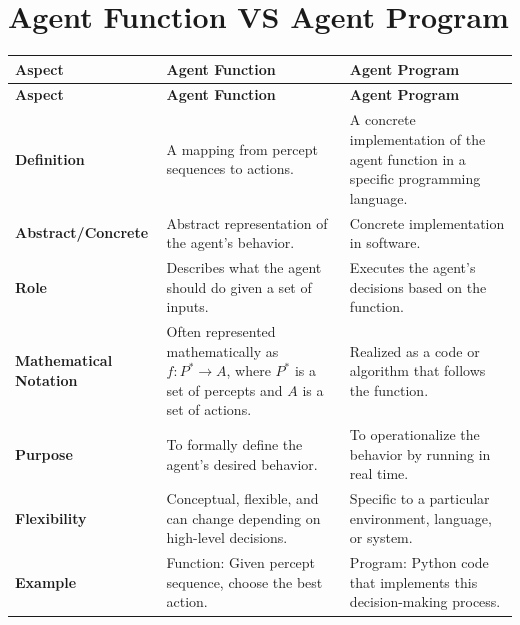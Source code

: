 

\section{Agent Function VS Agent Program \cite{chatgpt}} \label{Agent Function VS Agent Program}

\begin{customTableWrapper}{1.5}
\begin{longtable}{|p{4cm}|p{5.5cm}|p{5.5cm}|}
    \hline
    \textbf{Aspect} & \textbf{Agent Function} & \textbf{Agent Program} \\
    \hline
    \endfirsthead

    \hline
    \textbf{Aspect} & \textbf{Agent Function} & \textbf{Agent Program} \\
    \hline
    \endhead
    
    \hline
    \endfoot
    
    \hline
    \endlastfoot
    
    \textbf{Definition} & A mapping from percept sequences to actions. & A concrete implementation of the agent function in a specific programming language. \\
    \hline
    
    \textbf{Abstract/Concrete} & Abstract representation of the agent's behavior. & Concrete implementation in software. \\
    \hline
    
    \textbf{Role} & Describes what the agent should do given a set of inputs. & Executes the agent's decisions based on the function. \\
    \hline
    
    \textbf{Mathematical Notation} & Often represented mathematically as \( f: P^* \rightarrow A \), where \( P^* \) is a set of percepts and \( A \) is a set of actions. & Realized as a code or algorithm that follows the function. \\
    \hline
    
    \textbf{Purpose} & To formally define the agent's desired behavior. & To operationalize the behavior by running in real time. \\
    \hline
    
    \textbf{Flexibility} & Conceptual, flexible, and can change depending on high-level decisions. & Specific to a particular environment, language, or system. \\
    \hline

    \textbf{Example} & Function: Given percept sequence, choose the best action. & Program: Python code that implements this decision-making process. \\
    \hline
\end{longtable}
\end{customTableWrapper}











